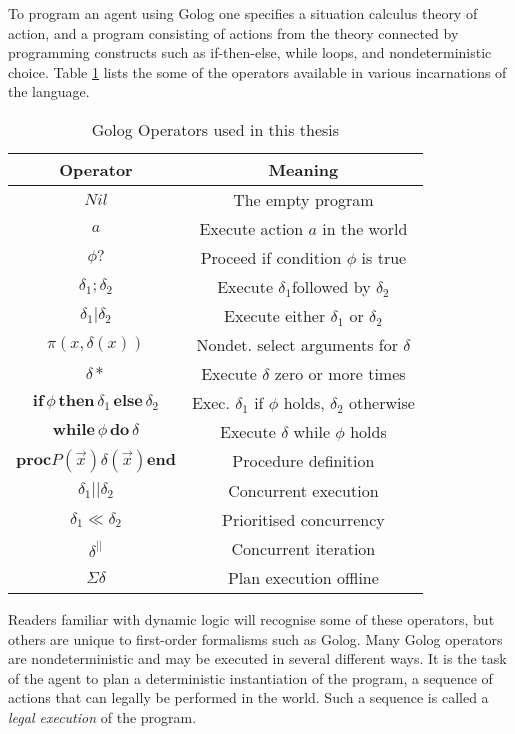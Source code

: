 To program an agent using Golog one specifies a situation calculus
theory of action, and a program consisting of actions from the theory
connected by programming constructs such as if-then-else, while loops,
and nondeterministic choice. Table \ref{tbl:Background:Golog-Operators}
lists the some of the operators available in various incarnations
of the language.

%
\begin{table}[h]
 

\begin{centering}
\begin{tabular}{|c|c|}
\hline 
Operator  & Meaning\tabularnewline
\hline
\hline 
$Nil$  & The empty program\tabularnewline
\hline 
$a$  & Execute action $a$ in the world\tabularnewline
\hline 
$\phi?$  & Proceed if condition $\phi$ is true\tabularnewline
\hline 
$\delta_{1};\delta_{2}$  & Execute $\delta_{1}$followed by $\delta_{2}$\tabularnewline
\hline 
$\delta_{1}|\delta_{2}$  & Execute either $\delta_{1}$ or $\delta_{2}$\tabularnewline
\hline 
$\pi(x,\delta(x))$  & Nondet. select arguments for $\delta$\tabularnewline
\hline 
$\delta*$  & Execute $\delta$ zero or more times\tabularnewline
\hline 
$\mathbf{if}\,\phi\,\mathbf{then}\,\delta_{1}\,\mathbf{else}\,\delta_{2}$  & Exec. $\delta_{1}$ if $\phi$ holds, $\delta_{2}$ otherwise\tabularnewline
\hline 
$\mathbf{while\,}\phi\mathbf{\, do}\,\delta$  & Execute $\delta$ while $\phi$ holds\tabularnewline
\hline 
$\mathbf{proc}P(\overrightarrow{x})\delta(\overrightarrow{x})\mathbf{end}$  & Procedure definition\tabularnewline
\hline 
$\delta_{1}||\delta_{2}$  & Concurrent execution\tabularnewline
\hline 
$\delta_{1}\ll\delta_{2}$  & Prioritised concurrency\tabularnewline
\hline 
$\delta^{||}$  & Concurrent iteration\tabularnewline
\hline 
$\Sigma\delta$  & Plan execution offline\tabularnewline
\hline
\end{tabular}
\par\end{centering}

\caption{Golog Operators used in this thesis\label{tbl:Background:Golog-Operators} }

\end{table}


Readers familiar with dynamic logic will recognise some of these operators,
but others are unique to first-order formalisms such as Golog. Many
Golog operators are nondeterministic and may be executed in several
different ways. It is the task of the agent to plan a deterministic
instantiation of the program, a sequence of actions that can legally
be performed in the world. Such a sequence is called a \emph{legal
execution} of the program.

